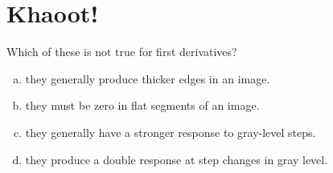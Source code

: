 \section{Khaoot!}
Which of these is not true for first derivatives?
\begin{enumerate}[(a)]
    \item they generally produce thicker edges in an image.
    \item they must be zero in flat segments of an image.
    \item they generally have a stronger response to gray-level steps.
    \item they produce a double response at step changes in gray level.
\end{enumerate}


